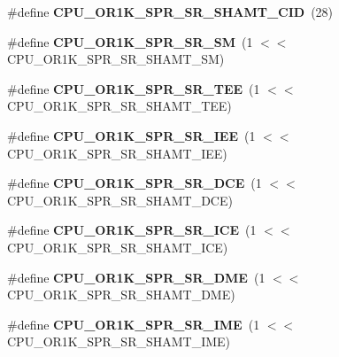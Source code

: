 \begin{DoxyCompactItemize}
\item 
\mbox{\label{or1k-utility_8h_af2aa19f2fedaa89963fedc7a8ae2c707}} 
\#define {\bfseries C\+P\+U\+\_\+\+O\+R1\+K\+\_\+\+S\+P\+R\+\_\+\+S\+R\+\_\+\+S\+H\+A\+M\+T\+\_\+\+C\+ID}~(28)
\item 
\mbox{\label{or1k-utility_8h_ad3f79fed91499ee29bbd7f09bc8f72c2}} 
\#define {\bfseries C\+P\+U\+\_\+\+O\+R1\+K\+\_\+\+S\+P\+R\+\_\+\+S\+R\+\_\+\+SM}~(1 $<$$<$ C\+P\+U\+\_\+\+O\+R1\+K\+\_\+\+S\+P\+R\+\_\+\+S\+R\+\_\+\+S\+H\+A\+M\+T\+\_\+\+SM)
\item 
\mbox{\label{or1k-utility_8h_acde7e6caf1eea9867d5dc3843d8bf2ef}} 
\#define {\bfseries C\+P\+U\+\_\+\+O\+R1\+K\+\_\+\+S\+P\+R\+\_\+\+S\+R\+\_\+\+T\+EE}~(1 $<$$<$ C\+P\+U\+\_\+\+O\+R1\+K\+\_\+\+S\+P\+R\+\_\+\+S\+R\+\_\+\+S\+H\+A\+M\+T\+\_\+\+T\+EE)
\item 
\mbox{\label{or1k-utility_8h_a286ca87390c66cfd986523ce8f8146a6}} 
\#define {\bfseries C\+P\+U\+\_\+\+O\+R1\+K\+\_\+\+S\+P\+R\+\_\+\+S\+R\+\_\+\+I\+EE}~(1 $<$$<$ C\+P\+U\+\_\+\+O\+R1\+K\+\_\+\+S\+P\+R\+\_\+\+S\+R\+\_\+\+S\+H\+A\+M\+T\+\_\+\+I\+EE)
\item 
\mbox{\label{or1k-utility_8h_aedc4ab89eb311bd9213d06f9ea183b0e}} 
\#define {\bfseries C\+P\+U\+\_\+\+O\+R1\+K\+\_\+\+S\+P\+R\+\_\+\+S\+R\+\_\+\+D\+CE}~(1 $<$$<$ C\+P\+U\+\_\+\+O\+R1\+K\+\_\+\+S\+P\+R\+\_\+\+S\+R\+\_\+\+S\+H\+A\+M\+T\+\_\+\+D\+CE)
\item 
\mbox{\label{or1k-utility_8h_aaf74090715157bfbce4b3d4c00dc3e99}} 
\#define {\bfseries C\+P\+U\+\_\+\+O\+R1\+K\+\_\+\+S\+P\+R\+\_\+\+S\+R\+\_\+\+I\+CE}~(1 $<$$<$ C\+P\+U\+\_\+\+O\+R1\+K\+\_\+\+S\+P\+R\+\_\+\+S\+R\+\_\+\+S\+H\+A\+M\+T\+\_\+\+I\+CE)
\item 
\mbox{\label{or1k-utility_8h_ad25923a78a40e92234fd82e79d4314d4}} 
\#define {\bfseries C\+P\+U\+\_\+\+O\+R1\+K\+\_\+\+S\+P\+R\+\_\+\+S\+R\+\_\+\+D\+ME}~(1 $<$$<$ C\+P\+U\+\_\+\+O\+R1\+K\+\_\+\+S\+P\+R\+\_\+\+S\+R\+\_\+\+S\+H\+A\+M\+T\+\_\+\+D\+ME)
\item 
\mbox{\label{or1k-utility_8h_a88d311e155013952f22a8f04fc2bbf5a}} 
\#define {\bfseries C\+P\+U\+\_\+\+O\+R1\+K\+\_\+\+S\+P\+R\+\_\+\+S\+R\+\_\+\+I\+ME}~(1 $<$$<$ C\+P\+U\+\_\+\+O\+R1\+K\+\_\+\+S\+P\+R\+\_\+\+S\+R\+\_\+\+S\+H\+A\+M\+T\+\_\+\+I\+ME)
$$
\end{DoxyCompactItemize}
